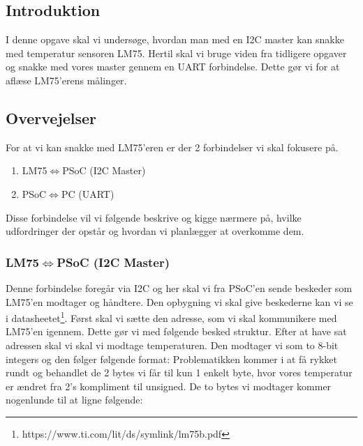 \documentclass[../main.tex]{subfiles}
\begin{document}
\subsection{Introduktion}
I denne opgave skal vi undersøge, hvordan man med en I2C master kan snakke med temperatur sensoren LM75.
Hertil skal vi bruge viden fra tidligere opgaver og snakke med vores master gennem en UART forbindelse. 
Dette gør vi for at aflæse LM75'erens målinger.

\subsection{Overvejelser}
For at vi kan snakke med LM75'eren er der 2 forbindelser vi skal fokusere på.
\begin{enumerate}
    \item LM75$\iff$PSoC (I2C Master)
    \item PSoC$\iff$PC (UART)
\end{enumerate}
Disse forbindelse vil vi følgende beskrive og kigge nærmere på, hvilke udfordringer der opstår og hvordan vi planlægger at overkomme dem.

\subsubsection{LM75$\iff$PSoC (I2C Master)}
Denne forbindelse foregår via I2C og her skal vi fra PSoC'en sende beskeder som LM75'en modtager og håndtere. Den opbygning vi skal give beskederne kan vi se i datasheetet\footnote{https://www.ti.com/lit/ds/symlink/lm75b.pdf}.
Først skal vi sætte den adresse, som vi skal kommunikere med LM75'en igennem. Dette gør vi med følgende besked struktur.
Efter at have sat adressen skal vi skal vi modtage temperaturen. Den modtager vi som to 8-bit integers og den følger følgende format:
Problematikken kommer i at få rykket rundt og behandlet de 2 bytes vi får til kun 1 enkelt byte, hvor vores temperatur er ændret fra 2's kompliment til unsigned.
De to bytes vi modtager kommer nogenlunde til at ligne følgende:
\end{document}
